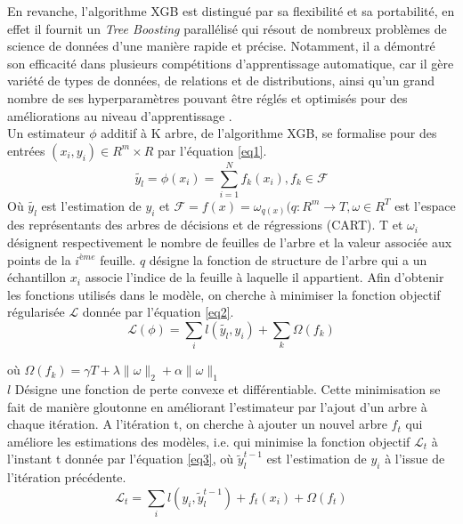 En revanche, l'algorithme XGB est distingué par sa flexibilité et sa portabilité, en effet il fournit un \textit{Tree Boosting} parallélisé qui résout de nombreux problèmes de science de données d'une manière rapide et précise. Notamment, il a démontré son efficacité dans plusieurs compétitions d’apprentissage automatique, car il gère variété de types de données, de relations et de distributions, ainsi qu'un grand nombre de ses hyperparamètres pouvant être réglés et optimisés pour des améliorations au niveau d'apprentissage \citep{chen2016xgboost}.\\


Un estimateur $\phi $ additif à K arbre, de l'algorithme XGB, se formalise pour des entrées $(x_i, y_i)\in R^m\times R$ par l’équation \ref{eq1}.
\begin{equation}\label{eq1}
    \widetilde{y_l}=\phi (x_i)=\sum_{i=1}^{N}f_k(x_i), f_k \in \mathcal{F}
\end{equation}
Où $\widetilde{y_l}$ est l’estimation de $y_i$ et $\mathcal{F}= f(x) = \omega_{q(x)} (q:R^m \xrightarrow{}T, \omega \in R^T$ est l’espace des représentants des arbres de décisions et de régressions (CART). T et $\omega_i $ désignent respectivement le nombre de feuilles de l’arbre et la valeur associée aux points de la $i^{ème}$ feuille. $q$ désigne la fonction de structure de l’arbre qui a un échantillon $x_i$ associe l’indice de la feuille à laquelle il appartient. Afin d’obtenir les fonctions utilisés dans le modèle, on cherche à minimiser la fonction objectif régularisée $\mathcal{L}$ donnée par l’équation \ref{eq2}.
\begin{equation}\label{eq2}
    \mathcal{L}(\phi) = \sum_i l(\widetilde{y_l},y_i)+\sum_{k}\Omega(f_k)
\end{equation}

où $\Omega(f_k) = \gamma T +\lambda \| \omega \|_2 + \alpha \| \omega \|_1$\\

$l$ Désigne une fonction de perte convexe et différentiable. Cette minimisation se fait de manière
gloutonne en améliorant l’estimateur par l’ajout d’un arbre à chaque itération. A l’itération t, on cherche
à ajouter un nouvel arbre $f_t$ qui améliore les estimations des modèles, i.e. qui minimise la fonction
objectif $\mathcal{L}_t$ à l’instant t donnée par l’équation \ref{eq3}, où $\widetilde{y}_{l}^{t-1}$ est l’estimation de $y_i$ à l’issue de l’itération
précédente.
\begin{equation}\label{eq3}
    \mathcal{L}_t = \sum_{i} l(y_i , \widetilde{y}_{l}^{t-1}) + f_{t}(x_i) + \Omega (f_t)
\end{equation}\\

